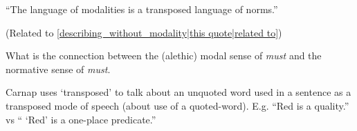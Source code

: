 ``The language of modalities is a transposed language of norms.''

(Related to \ref{describing_without_modality|this quote|related to})

What is the connection between the (alethic) modal sense of \emph{must} and the
 normative sense of \emph{must}.

Carnap uses `transposed' to talk about an unquoted word used in a sentence as a
transposed mode of speech (about use of a quoted-word). E.g. ``Red is a
quality.'' vs `` `Red' is a one-place predicate.''

